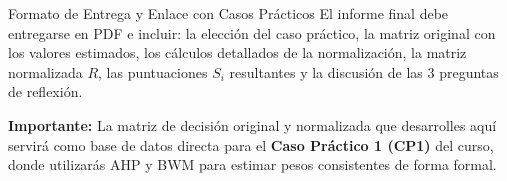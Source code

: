 \documentclass[11pt,a4paper]{article}
\begin{document}
\begin{alertbox}{Formato de Entrega y Enlace con Casos Prácticos}
  El informe final debe entregarse en PDF e incluir: la elección del caso práctico, la matriz original con los valores estimados, los cálculos detallados de la normalización, la matriz normalizada $R$, las puntuaciones $S_i$ resultantes y la discusión de las 3 preguntas de reflexión.
  
  \textbf{Importante:} La matriz de decisión original y normalizada que desarrolles aquí servirá como base de datos directa para el \textbf{Caso Práctico 1 (CP1)} del curso, donde utilizarás AHP y BWM para estimar pesos consistentes de forma formal.
\end{alertbox}
\end{document}
